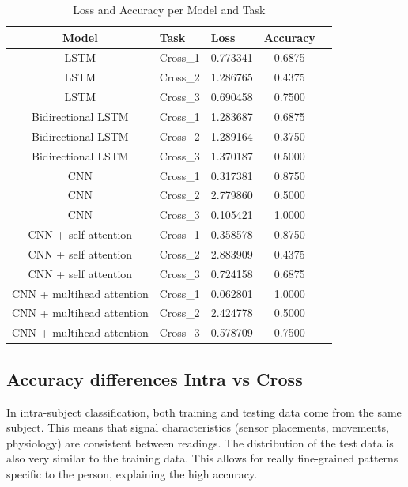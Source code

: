 \documentclass[conference]{IEEEtran}
\begin{document}
\begin{table}[H]
    \centering
    \caption{Loss and Accuracy per Model and Task}
    \begin{tabular}{|c|l|l|c|c|}
    \hline
    \textbf{Model} & \textbf{Task} & \textbf{Loss} & \textbf{Accuracy} \\
    \hline
    LSTM                    & Cross\_1                  & 0.773341  & 0.6875 \\
    LSTM                    & Cross\_2                  & 1.286765  & 0.4375 \\
    LSTM                    & Cross\_3                  & 0.690458  & 0.7500 \\
    Bidirectional LSTM     & Cross\_1                  & 1.283687  & 0.6875 \\
    Bidirectional LSTM     & Cross\_2                  & 1.289164  & 0.3750 \\
    Bidirectional LSTM     & Cross\_3                  & 1.370187  & 0.5000 \\
    CNN                    & Cross\_1                  & 0.317381  & 0.8750 \\
    CNN                    & Cross\_2                  & 2.779860  & 0.5000 \\
    CNN                    & Cross\_3                  & 0.105421  & 1.0000 \\
    CNN + self attention   & Cross\_1                  & 0.358578  & 0.8750 \\
    CNN + self attention   & Cross\_2                  & 2.883909  & 0.4375 \\
    CNN + self attention   & Cross\_3                  & 0.724158  & 0.6875 \\
    CNN + multihead attention & Cross\_1              & 0.062801  & 1.0000 \\
    CNN + multihead attention & Cross\_2              & 2.424778  & 0.5000 \\
    CNN + multihead attention & Cross\_3              & 0.578709  & 0.7500 \\
    \hline
    \end{tabular}
    \label{tab:cross_model_results}
    \end{table}
    


\subsection{Accuracy differences Intra vs Cross}
In intra-subject classification, both training and testing data come from the same subject. This means that signal characteristics (sensor placements, movements, physiology) are consistent between readings. The distribution of the test data is also very similar to the training data. This allows for really fine-grained patterns specific to the person, explaining the high accuracy. 
\end{document}
